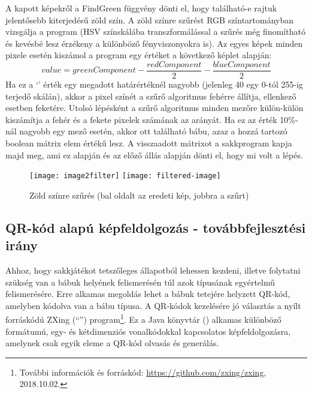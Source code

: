 \documentclass[../documentation.tex]{subfiles}
\begin{document}
A kapott képekről a FindGreen függvény dönti el, hogy található-e rajtuk jelentősebb kiterjedésű zöld szín. A zöld színre szűrést RGB színtartományban vizsgálja a program (HSV színskálába transzformálással a szűrés még finomítható és kevésbé lesz érzékeny a különböző fényviszonyokra is). Az egyes képek minden pixele esetén kiszámol a program egy értéket a következő képlet alapján:
\[value = greenComponent - \dfrac{redComponent}{2}  - \dfrac{blueComponent}{2}\]
Ha ez a `' érték egy megadott határértéknél nagyobb (jelenleg 40 egy 0-tól 255-ig terjedő skálán), akkor a pixel színét a szűrő algoritmus fehérre állítja, ellenkező esetben feketére. Utolsó lépésként a szűrő algoritmus minden mezőre külön-külön kiszámítja a fehér és a fekete pixelek számának az arányát. Ha ez az érték 10\%-nál nagyobb egy mező esetén, akkor ott található bábu, azaz a hozzá tartozó boolean mátrix elem  értékű lesz. A visszaadott mátrixot a sakkprogram kapja majd meg, ami ez alapján és az előző állás alapján dönti el, hogy mi volt a lépés.

\begin{figure}[h]
\centering
	\texttt{[image: image2filter]}
	\texttt{[image: filtered-image]}
\caption{Zöld színre szűrés (bal oldalt az eredeti kép, jobbra a szűrt)}
\label{fig:colorfiltering}
\end{figure}


\subsection{QR-kód alapú képfeldolgozás - továbbfejlesztési irány} \label{qrsection}
Ahhoz, hogy sakkjátékot tetszőleges állapotból lehessen kezdeni, illetve folytatni szükség van a bábuk helyének felismerésén túl azok típusának egyértelmű felismerésére. Erre alkamas megoldás lehet a bábuk tetejére helyzett QR-kód, amelyben kódolva van a bábu típusa. A QR-kódok kezelésére jó választás a nyílt forráskódú ZXing (``'') program\footnote{További információk és forráskód: \url{https://github.com/zxing/zxing}, 2018.10.02.}. Ez a Java könyvtár () alkamas különböző formátumú, egy- és kétdimenziós vonalkódokkal kapcsolatos képfeldolgozásra, amelynek csak egyik eleme a QR-kód olvasás és generálás.
\end{document}
